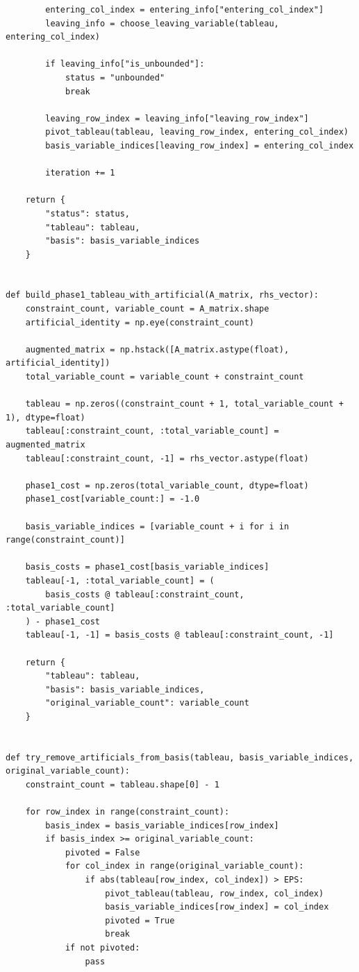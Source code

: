 \documentclass[a4paper,14pt]{extarticle}
\begin{document}
\begin{lstlisting}
        entering_col_index = entering_info["entering_col_index"]
        leaving_info = choose_leaving_variable(tableau, entering_col_index)

        if leaving_info["is_unbounded"]:
            status = "unbounded"
            break

        leaving_row_index = leaving_info["leaving_row_index"]
        pivot_tableau(tableau, leaving_row_index, entering_col_index)
        basis_variable_indices[leaving_row_index] = entering_col_index

        iteration += 1

    return {
        "status": status,
        "tableau": tableau,
        "basis": basis_variable_indices
    }


def build_phase1_tableau_with_artificial(A_matrix, rhs_vector):
    constraint_count, variable_count = A_matrix.shape
    artificial_identity = np.eye(constraint_count)

    augmented_matrix = np.hstack([A_matrix.astype(float), artificial_identity])
    total_variable_count = variable_count + constraint_count

    tableau = np.zeros((constraint_count + 1, total_variable_count + 1), dtype=float)
    tableau[:constraint_count, :total_variable_count] = augmented_matrix
    tableau[:constraint_count, -1] = rhs_vector.astype(float)

    phase1_cost = np.zeros(total_variable_count, dtype=float)
    phase1_cost[variable_count:] = -1.0

    basis_variable_indices = [variable_count + i for i in range(constraint_count)]

    basis_costs = phase1_cost[basis_variable_indices]
    tableau[-1, :total_variable_count] = (
        basis_costs @ tableau[:constraint_count, :total_variable_count]
    ) - phase1_cost
    tableau[-1, -1] = basis_costs @ tableau[:constraint_count, -1]

    return {
        "tableau": tableau,
        "basis": basis_variable_indices,
        "original_variable_count": variable_count
    }


def try_remove_artificials_from_basis(tableau, basis_variable_indices, original_variable_count):
    constraint_count = tableau.shape[0] - 1

    for row_index in range(constraint_count):
        basis_index = basis_variable_indices[row_index]
        if basis_index >= original_variable_count:
            pivoted = False
            for col_index in range(original_variable_count):
                if abs(tableau[row_index, col_index]) > EPS:
                    pivot_tableau(tableau, row_index, col_index)
                    basis_variable_indices[row_index] = col_index
                    pivoted = True
                    break
            if not pivoted:
                pass



\end{lstlisting}
\end{document}
